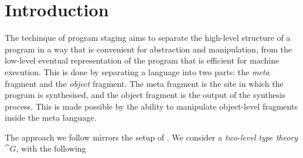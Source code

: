 \section{Introduction}\label{sec:intro}

The techinque of program staging aims to separate the high-level structure of a
program in a way that is convenient for abstraction and manipulation, from the
low-level eventual representation of the program that is efficient for machine
execution. This is done by separating a language into two parts: the
\emph{meta} fragment and the \emph{object} fragment. The meta fragment is the
site in which the program is synthesised, and the object fragment is the output
of the synthesis process. This is made possible by the ability to manipulate
object-level fragments inside the meta language.

The approach we follow mirrors the setup of \cite{Kovacs2022-vb}. We consider a
\emph{two-level type theory} $\cat{G}$, with the following


